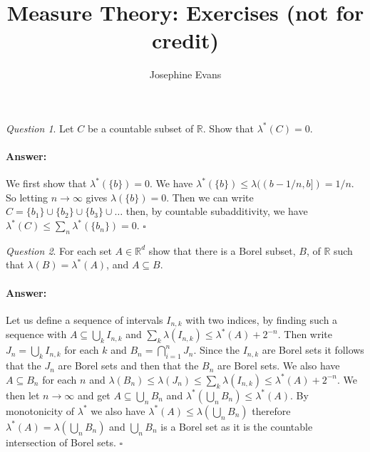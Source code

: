 \documentclass[11pt]{article}
\author{
Josephine Evans
}
\title{Measure Theory: Exercises (not for credit)}
\theoremstyle{definition}
\theoremstyle{remark}
\newtheorem{q}{Question}
\newenvironment{ans}{\paragraph{Answer:}}{\hfill$\square$ \vspace{20pt}}
\begin{document}
\maketitle

\begin{q}
Let $C$ be a countable subset of $\mathbb{R}$. Show that $\lambda^*(C) = 0$.
\end{q}
\begin{ans}
We first show that $\lambda^*(\{b\}) = 0$. We have $\lambda^*(\{b\}) \leq \lambda((b-1/n,b]) = 1/n$. So letting $n \rightarrow \infty$ gives $\lambda(\{b\})=0$. Then we can write $C = \{b_1\} \cup \{b_2\} \cup \{b_3\} \cup \dots$ then, by countable subadditivity, we have $\lambda^*(C) \leq \sum_n \lambda^*(\{b_n\}) = 0$.
\end{ans}

\begin{q}
For each set $A \in \mathbb{R}^d$ show that there is a Borel subset, $B$, of $\mathbb{R}$ such that $\lambda(B) = \lambda^*(A)$, and $A \subseteq B$.
\end{q}
\begin{ans}
Let us define a sequence of intervals $I_{n,k}$ with two indices, by finding such a sequence with $A \subseteq \bigcup_k I_{n,k}$ and $\sum_k \lambda(I_{n,k}) \leq \lambda^*(A) + 2^{-n}$. Then write $J_n = \bigcup_k I_{n,k}$ for each $k$ and $B_n = \bigcap_{i=1}^n J_n$. Since the $I_{n,k}$ are Borel sets it follows that the $J_n$ are Borel sets and then that the $B_n$ are Borel sets. We also have $A \subseteq B_n$ for each $n$ and $\lambda(B_n) \leq \lambda(J_n) \leq \sum_k \lambda(I_{n,k}) \leq \lambda^*(A) + 2^{-n}$. We then let $n \rightarrow \infty$ and get $A \subseteq \bigcup_n B_n$ and $\lambda^*(\bigcup_n B_n) \leq \lambda^*(A)$. By monotonicity of $\lambda^*$ we also have $\lambda^*(A) \leq \lambda( \bigcup_n B_n)$ therefore $\lambda^*(A) = \lambda( \bigcup_n B_n)$ and $\bigcup_n B_n$ is a Borel set as it is the countable intersection of Borel sets.
\end{ans}
\end{document}
